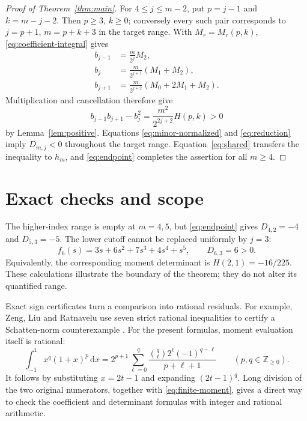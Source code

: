 \documentclass[11pt]{article}
\newcommand{\dd}{\,\mathrm{d}}
\begin{document}
\begin{proof}[Proof of Theorem~\ref{thm:main}]
For $4\le j\le m-2$, put $p=j-1$ and $k=m-j-2$.
Then $p\ge3$, $k\ge0$; conversely every such pair corresponds to
$j=p+1$, $m=p+k+3$ in the target range. With $M_r=M_r(p,k)$,
\eqref{eq:coefficient-integral} gives
\begin{equation}\label{eq:adjacent}
 \begin{aligned}
 b_{j-1}&=\frac{m}{2^j}M_2,\\
 b_j&=\frac{m}{2^{j+1}}(M_1+M_2),\\
 b_{j+1}&=\frac{m}{2^{j+2}}(M_0+2M_1+M_2).
 \end{aligned}
\end{equation}
Multiplication and cancellation therefore give
\begin{equation}\label{eq:reduction}
 b_{j-1}b_{j+1}-b_j^2=\frac{m^2}{2^{2j+2}}H(p,k)>0
\end{equation}
by Lemma~\ref{lem:positive}. Equations \eqref{eq:minor-normalized}
and \eqref{eq:reduction} imply $D_{m,j}<0$ throughout the target
range. Equation~\eqref{eq:shared} transfers the inequality to $h_m$,
and \eqref{eq:endpoint} completes the assertion for all $m\ge4$.
\end{proof}

\section{Exact checks and scope}

The higher-index range is empty at $m=4,5$, but
\eqref{eq:endpoint} gives $D_{4,2}=-4$ and $D_{5,3}=-5$.
The lower cutoff cannot be replaced uniformly by $j=3$:
\[
 f_6(s)=3s+6s^2+7s^3+4s^4+s^5,\qquad D_{6,3}=6>0.
\]
Equivalently, the corresponding moment determinant is
$H(2,1)=-16/225$. These calculations illustrate the boundary of the
theorem; they do not alter its quantified range.

Exact sign certificates turn a comparison into rational residuals.
For example, Zeng, Liu and Ratnavelu use seven strict rational
inequalities to certify a Schatten-norm counterexample
\cite[Section~2, equations~(11)--(18)]{ZengLiuRatnavelu2026}.
For the present formulas, moment evaluation itself is rational:
\begin{equation}\label{eq:finite-moment}
 \int_{-1}^1 x^q(1+x)^p\dd x
 =2^{p+1}\sum_{\ell=0}^q
 \frac{\binom q\ell 2^\ell(-1)^{q-\ell}}{p+\ell+1}
 \qquad(p,q\in\mathbb Z_{\ge0}).
\end{equation}
It follows by substituting $x=2t-1$ and expanding $(2t-1)^q$.
Long division of the two original numerators, together with
\eqref{eq:finite-moment}, gives a direct way to check the coefficient
and determinant formulas with integer and rational arithmetic.
\end{document}
